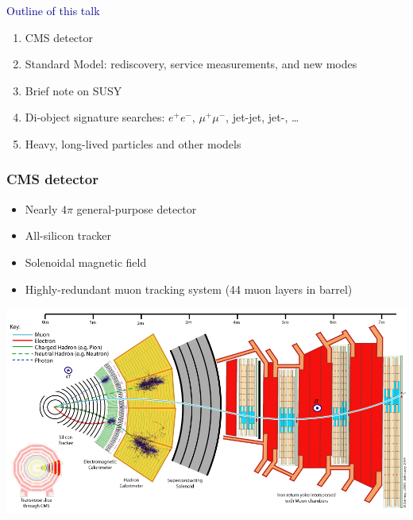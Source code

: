 \documentclass[compress]{beamer}
\begin{document}
\begin{frame}
\vspace{-0.6 cm}
\hspace{-0.83 cm} \textcolor{darkblue}{\Large Outline of this talk}

\vspace{-0.2 cm}
\begin{enumerate}\setlength{\itemsep}{-0.05 cm}
\item CMS detector
\item Standard Model: rediscovery, service measurements, and new modes
\item Brief note on SUSY
\item Di-object signature searches: $e^+e^-$, $\mu^+\mu^-$, jet-jet, jet-\met, \ldots
\item Heavy, long-lived particles and other models
\end{enumerate}
\end{frame}

\begin{frame}
\frametitle{CMS detector}
\begin{itemize}\setlength{\itemsep}{-0.05 cm}
\item Nearly $4\pi$ general-purpose detector
\item All-silicon tracker
\item Solenoidal magnetic field
\item Highly-redundant muon tracking system (44 muon layers in barrel)
\end{itemize}

\includegraphics[width=\linewidth]{CMS_Slice.png}

\mbox{ }
\end{frame}
\end{document}
